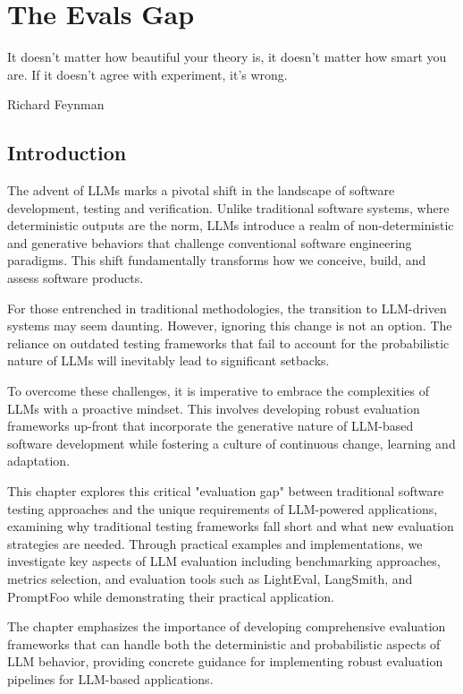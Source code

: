 \setchapterpreamble[u]{\margintoc}

\chapter{The Evals Gap}
\label{chapter:evals}

\epigraph{It doesn't matter how beautiful your theory is,
it doesn't matter how smart you are.
If it doesn't agree with experiment, it's wrong.}{Richard Feynman}

\section{Introduction}

The advent of LLMs marks a pivotal shift in the landscape of software development, testing and verification. Unlike traditional software systems, where deterministic outputs are the norm, LLMs introduce a realm of non-deterministic and generative behaviors that challenge conventional software engineering paradigms. This shift fundamentally transforms how we conceive, build, and assess software products.

For those entrenched in traditional methodologies, the transition to LLM-driven systems may seem daunting. However, ignoring this change is not an option. The reliance on outdated testing frameworks that fail to account for the probabilistic nature of LLMs will inevitably lead to significant setbacks.

To overcome these challenges, it is imperative to embrace the complexities of LLMs with a proactive mindset. This involves developing robust evaluation frameworks up-front that incorporate the generative nature of LLM-based software development while fostering a culture of continuous change, learning and adaptation.

This chapter explores this critical "evaluation gap" between traditional software testing approaches and the unique requirements of LLM-powered applications, examining why traditional testing frameworks fall short and what new evaluation strategies are needed. Through practical examples and implementations, we investigate key aspects of LLM evaluation including benchmarking approaches, metrics selection, and evaluation tools such as LightEval, LangSmith, and PromptFoo while demonstrating their practical application. 

The chapter emphasizes the importance of developing comprehensive evaluation frameworks that can handle both the deterministic and probabilistic aspects of LLM behavior, providing concrete guidance for implementing robust evaluation pipelines for LLM-based applications.

